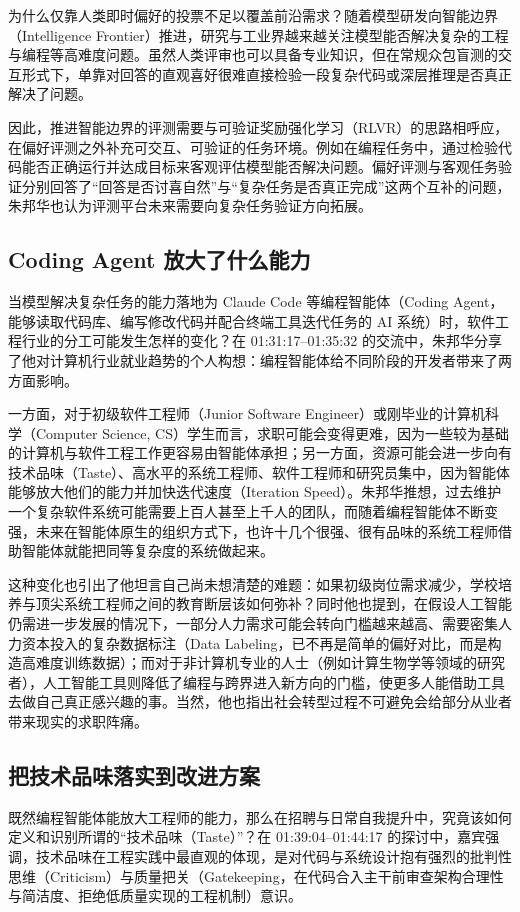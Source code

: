 \documentclass[UTF8,a4paper,11pt,fontset=fandol]{ctexart}
\begin{document}
为什么仅靠人类即时偏好的投票不足以覆盖前沿需求？随着模型研发向智能边界（Intelligence Frontier）推进，研究与工业界越来越关注模型能否解决复杂的工程与编程等高难度问题。虽然人类评审也可以具备专业知识，但在常规众包盲测的交互形式下，单靠对回答的直观喜好很难直接检验一段复杂代码或深层推理是否真正解决了问题。

因此，推进智能边界的评测需要与可验证奖励强化学习（RLVR）的思路相呼应，在偏好评测之外补充可交互、可验证的任务环境。例如在编程任务中，通过检验代码能否正确运行并达成目标来客观评估模型能否解决问题。偏好评测与客观任务验证分别回答了“回答是否讨喜自然”与“复杂任务是否真正完成”这两个互补的问题，朱邦华也认为评测平台未来需要向复杂任务验证方向拓展。

\subsection{Coding Agent 放大了什么能力}
当模型解决复杂任务的能力落地为 Claude Code 等编程智能体（Coding Agent，能够读取代码库、编写修改代码并配合终端工具迭代任务的 AI 系统）时，软件工程行业的分工可能发生怎样的变化？在 01:31:17–01:35:32 的交流中，朱邦华分享了他对计算机行业就业趋势的个人构想：编程智能体给不同阶段的开发者带来了两方面影响。

一方面，对于初级软件工程师（Junior Software Engineer）或刚毕业的计算机科学（Computer Science, CS）学生而言，求职可能会变得更难，因为一些较为基础的计算机与软件工程工作更容易由智能体承担；另一方面，资源可能会进一步向有技术品味（Taste）、高水平的系统工程师、软件工程师和研究员集中，因为智能体能够放大他们的能力并加快迭代速度（Iteration Speed）。朱邦华推想，过去维护一个复杂软件系统可能需要上百人甚至上千人的团队，而随着编程智能体不断变强，未来在智能体原生的组织方式下，也许十几个很强、很有品味的系统工程师借助智能体就能把同等复杂度的系统做起来。

这种变化也引出了他坦言自己尚未想清楚的难题：如果初级岗位需求减少，学校培养与顶尖系统工程师之间的教育断层该如何弥补？同时他也提到，在假设人工智能仍需进一步发展的情况下，一部分人力需求可能会转向门槛越来越高、需要密集人力资本投入的复杂数据标注（Data Labeling，已不再是简单的偏好对比，而是构造高难度训练数据）；而对于非计算机专业的人士（例如计算生物学等领域的研究者），人工智能工具则降低了编程与跨界进入新方向的门槛，使更多人能借助工具去做自己真正感兴趣的事。当然，他也指出社会转型过程不可避免会给部分从业者带来现实的求职阵痛。

\subsection{把技术品味落实到改进方案}
既然编程智能体能放大工程师的能力，那么在招聘与日常自我提升中，究竟该如何定义和识别所谓的“技术品味（Taste）”？在 01:39:04–01:44:17 的探讨中，嘉宾强调，技术品味在工程实践中最直观的体现，是对代码与系统设计抱有强烈的批判性思维（Criticism）与质量把关（Gatekeeping，在代码合入主干前审查架构合理性与简洁度、拒绝低质量实现的工程机制）意识。
\end{document}
